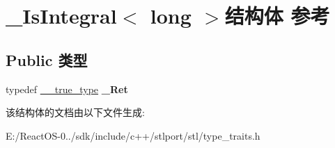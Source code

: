 \hypertarget{struct___is_integral_3_01long_01_4}{}\section{\+\_\+\+Is\+Integral$<$ long $>$结构体 参考}
\label{struct___is_integral_3_01long_01_4}
\subsection*{Public 类型}
\begin{DoxyCompactItemize}
\item 
\mbox{\label{struct___is_integral_3_01long_01_4_ac634abac318cca58510cf8719843d9eb}} 
typedef \hyperlink{struct____true__type}{\+\_\+\+\_\+true\+\_\+type} {\bfseries \+\_\+\+Ret}
\end{DoxyCompactItemize}


该结构体的文档由以下文件生成\+:\begin{DoxyCompactItemize}
\item 
E\+:/\+React\+O\+S-\/0../sdk/include/c++/stlport/stl/type\+\_\+traits.\+h\end{DoxyCompactItemize}
